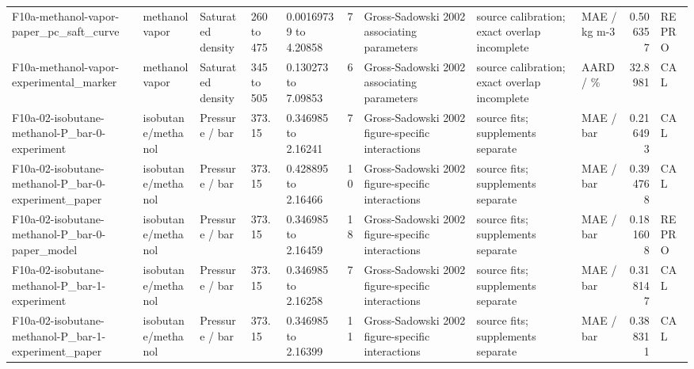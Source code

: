 \begin{landscape}
\begin{longtable}{L{1.9cm}L{2.5cm}L{2.1cm}L{1.6cm}L{1.6cm}rL{2.4cm}L{1.9cm}L{2.2cm}rL{1cm}}
F10a-\allowbreak{}methanol-\allowbreak{}vapor-\allowbreak{}paper\_\allowbreak{}pc\_\allowbreak{}saft\_\allowbreak{}curve & methanol vapor & Saturated density & 260 to 475 & 0.00169739 to 4.20858 & 7 & Gross-\allowbreak{}Sadowski 2002 associating parameters & source calibration; exact overlap incomplete & MAE /\allowbreak{} kg m-\allowbreak{}3 & 0.506357 & REPRO \\
F10a-\allowbreak{}methanol-\allowbreak{}vapor-\allowbreak{}experimental\_\allowbreak{}marker & methanol vapor & Saturated density & 345 to 505 & 0.130273 to 7.09853 & 6 & Gross-\allowbreak{}Sadowski 2002 associating parameters & source calibration; exact overlap incomplete & AARD /\allowbreak{} \% & 32.8981 & CAL \\
F10a-\allowbreak{}02-\allowbreak{}isobutane-\allowbreak{}methanol-\allowbreak{}P\_\allowbreak{}bar-\allowbreak{}0-\allowbreak{}experiment & isobutane/\allowbreak{}methanol & Pressure /\allowbreak{} bar & 373.15 & 0.346985 to 2.16241 & 7 & Gross-\allowbreak{}Sadowski 2002 figure-\allowbreak{}specific interactions & source fits; supplements separate & MAE /\allowbreak{} bar & 0.216493 & CAL \\
F10a-\allowbreak{}02-\allowbreak{}isobutane-\allowbreak{}methanol-\allowbreak{}P\_\allowbreak{}bar-\allowbreak{}0-\allowbreak{}experiment\_\allowbreak{}paper & isobutane/\allowbreak{}methanol & Pressure /\allowbreak{} bar & 373.15 & 0.428895 to 2.16466 & 10 & Gross-\allowbreak{}Sadowski 2002 figure-\allowbreak{}specific interactions & source fits; supplements separate & MAE /\allowbreak{} bar & 0.394768 & CAL \\
F10a-\allowbreak{}02-\allowbreak{}isobutane-\allowbreak{}methanol-\allowbreak{}P\_\allowbreak{}bar-\allowbreak{}0-\allowbreak{}paper\_\allowbreak{}model & isobutane/\allowbreak{}methanol & Pressure /\allowbreak{} bar & 373.15 & 0.346985 to 2.16459 & 18 & Gross-\allowbreak{}Sadowski 2002 figure-\allowbreak{}specific interactions & source fits; supplements separate & MAE /\allowbreak{} bar & 0.181608 & REPRO \\
F10a-\allowbreak{}02-\allowbreak{}isobutane-\allowbreak{}methanol-\allowbreak{}P\_\allowbreak{}bar-\allowbreak{}1-\allowbreak{}experiment & isobutane/\allowbreak{}methanol & Pressure /\allowbreak{} bar & 373.15 & 0.346985 to 2.16258 & 7 & Gross-\allowbreak{}Sadowski 2002 figure-\allowbreak{}specific interactions & source fits; supplements separate & MAE /\allowbreak{} bar & 0.318147 & CAL \\
F10a-\allowbreak{}02-\allowbreak{}isobutane-\allowbreak{}methanol-\allowbreak{}P\_\allowbreak{}bar-\allowbreak{}1-\allowbreak{}experiment\_\allowbreak{}paper & isobutane/\allowbreak{}methanol & Pressure /\allowbreak{} bar & 373.15 & 0.346985 to 2.16399 & 11 & Gross-\allowbreak{}Sadowski 2002 figure-\allowbreak{}specific interactions & source fits; supplements separate & MAE /\allowbreak{} bar & 0.388311 & CAL \\

\end{longtable}
\end{landscape}
